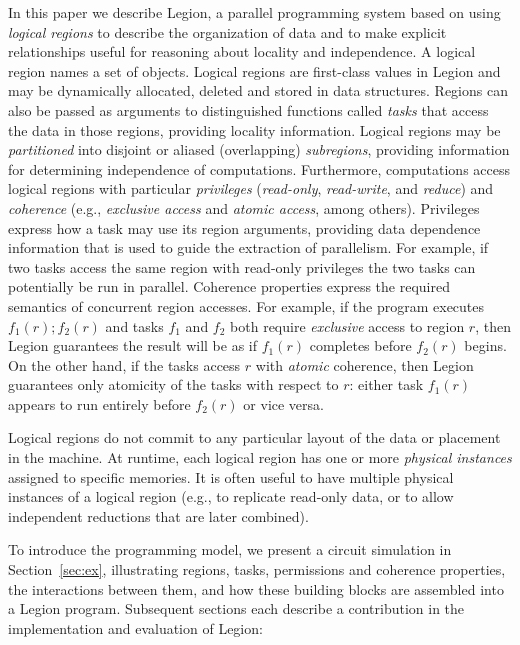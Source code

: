 \documentclass[conference]{IEEEtran}
\begin{document}
In this paper we describe Legion, a parallel programming system based
on using {\em logical regions} to describe the organization of data
and to make explicit relationships useful for reasoning about locality
and independence.
A logical region names a set of objects.  Logical regions are first-class 
values in Legion and may be dynamically allocated, deleted and stored
in data structures. Regions can also be passed as arguments
to distinguished functions called {\em tasks} that access the data in
those regions, providing locality information.  Logical regions may be
{\em partitioned} into disjoint or aliased (overlapping) {\em subregions}, providing
information for determining independence of computations.
Furthermore, computations access logical regions with particular {\em
  privileges} ({\em read-only}, {\em read-write}, and {\em reduce}) and {\em coherence} (e.g., {\em exclusive access} and {\em
  atomic access}, among others).  Privileges express how a task may use
its region arguments, providing data dependence information that
is used to guide the extraction of parallelism.  For example, if two tasks
access the same region with read-only privileges the two tasks
can potentially be run in parallel.
Coherence properties express the required semantics of concurrent region accesses.
For example, if the program executes $f_1(r); f_2(r)$ and tasks $f_1$
and $f_2$ both require {\em exclusive} access to region $r$, then Legion guarantees the result will
be as if $f_1(r)$ completes before $f_2(r)$ begins.   On the other hand, if
the tasks access $r$ with {\em atomic} coherence, then Legion
guarantees only atomicity of the tasks with respect to $r$: either task $f_1(r)$
appears to run entirely before $f_2(r)$ or vice versa.

Logical regions do not commit to any particular layout of the data or
placement in the machine.  At runtime, each logical region has one or
more {\em physical instances} assigned to specific memories.  It is often useful to have multiple
physical instances of a logical region (e.g., to replicate read-only data, or to allow
independent reductions that are later combined).

To introduce the programming model, we present
a circuit simulation in
Section~\ref{sec:ex}, illustrating regions, tasks,
permissions and coherence properties, the interactions between them,
and how these building blocks are assembled into a Legion
program.  Subsequent sections each describe a contribution in the
implementation and evaluation of Legion:
\end{document}
